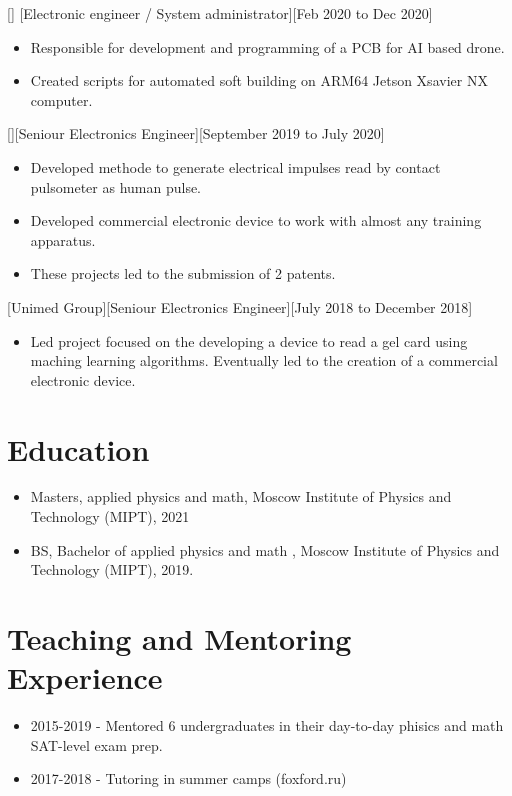\documentclass{article}
\begin{document}
[]
[Electronic engineer / System administrator][Feb 2020 to Dec 2020]

\begin{itemize}
\item Responsible for development and programming of a PCB for AI based drone.
\item Created scripts for automated soft building on ARM64 Jetson Xsavier NX computer.
\end{itemize}


[][Seniour Electronics Engineer][September 2019 to July 2020]

\begin{itemize}
\item Developed methode to generate electrical impulses read by contact pulsometer as human pulse.
\item Developed commercial electronic device to work with almost any training apparatus.
\item These projects led to the submission of 2 patents.
\end{itemize}

[Unimed Group][Seniour Electronics Engineer][July 2018 to December 2018]

\begin{itemize}
\item Led project focused on the developing a device to read a gel card using maching learning algorithms. Eventually led to the creation of a commercial electronic device.
\end{itemize}


\section{Education}

\begin{itemize}
\item Masters, applied physics and math, Moscow Institute of Physics and Technology (MIPT), 2021
\item BS, Bachelor of applied physics and math , Moscow Institute of Physics and Technology (MIPT), 2019.
\end{itemize}

\section{Teaching and Mentoring Experience }
\begin{itemize}
\item 2015-2019 - Mentored 6 undergraduates in their day-to-day phisics and math SAT-level exam prep.
\item 2017-2018 - Tutoring in summer camps (foxford.ru)
\end{itemize}
\end{document}
